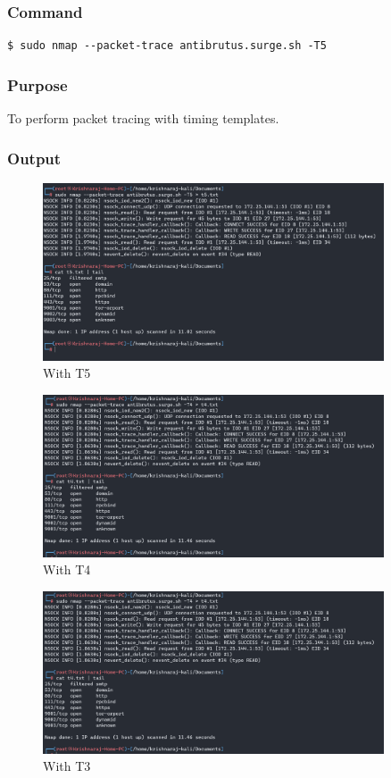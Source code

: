 \documentclass[11pt]{article}
\begin{document}
\subsubsection*{Command}
\begin{verbatim}
$ sudo nmap --packet-trace antibrutus.surge.sh -T5
\end{verbatim}

\subsubsection*{Purpose}
To perform packet tracing with timing templates.

\subsubsection*{Output}
\begin{figure}[H]
    \centering
    \includegraphics[width=0.9\textwidth]{t5.png}
    \caption{With T5}
    \label{fig:1}
\end{figure}
\begin{figure}[H]
    \centering
    \includegraphics[width=0.9\textwidth]{t4.png}
    \caption{With T4}
    \label{fig:1}
\end{figure}
\begin{figure}[H]
    \centering
    \includegraphics[width=0.9\textwidth]{t3.png}
    \caption{With T3}
    \label{fig:1}
\end{figure}
\end{document}
